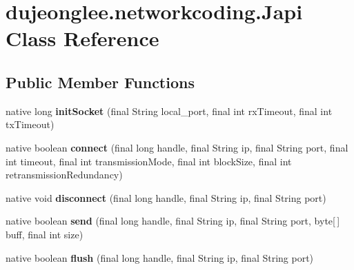 \hypertarget{classdujeonglee_1_1networkcoding_1_1_japi}{}\section{dujeonglee.\+networkcoding.\+Japi Class Reference}
\label{classdujeonglee_1_1networkcoding_1_1_japi}
\subsection*{Public Member Functions}
\begin{DoxyCompactItemize}
\item 
native long {\bfseries init\+Socket} (final String local\+\_\+port, final int rx\+Timeout, final int tx\+Timeout)\hypertarget{classdujeonglee_1_1networkcoding_1_1_japi_abd9deb66455ecbb05f1de3f5df9d3ce8}{}\label{classdujeonglee_1_1networkcoding_1_1_japi_abd9deb66455ecbb05f1de3f5df9d3ce8}

\item 
native boolean {\bfseries connect} (final long handle, final String ip, final String port, final int timeout, final int transmission\+Mode, final int block\+Size, final int retransmission\+Redundancy)\hypertarget{classdujeonglee_1_1networkcoding_1_1_japi_aa281c3bf3030b260d032949b2f823c68}{}\label{classdujeonglee_1_1networkcoding_1_1_japi_aa281c3bf3030b260d032949b2f823c68}

\item 
native void {\bfseries disconnect} (final long handle, final String ip, final String port)\hypertarget{classdujeonglee_1_1networkcoding_1_1_japi_a1b4ae9464add993849f3e8eb846e12c3}{}\label{classdujeonglee_1_1networkcoding_1_1_japi_a1b4ae9464add993849f3e8eb846e12c3}

\item 
native boolean {\bfseries send} (final long handle, final String ip, final String port, byte\mbox{[}$\,$\mbox{]} buff, final int size)\hypertarget{classdujeonglee_1_1networkcoding_1_1_japi_a437a3904603de451fb5e04d26cca7a22}{}\label{classdujeonglee_1_1networkcoding_1_1_japi_a437a3904603de451fb5e04d26cca7a22}

\item 
native boolean {\bfseries flush} (final long handle, final String ip, final String port)\hypertarget{classdujeonglee_1_1networkcoding_1_1_japi_a6f721acb1bb77e9f40322b189f0348a7}{}\label{classdujeonglee_1_1networkcoding_1_1_japi_a6f721acb1bb77e9f40322b189f0348a7}


\end{DoxyCompactItemize}
